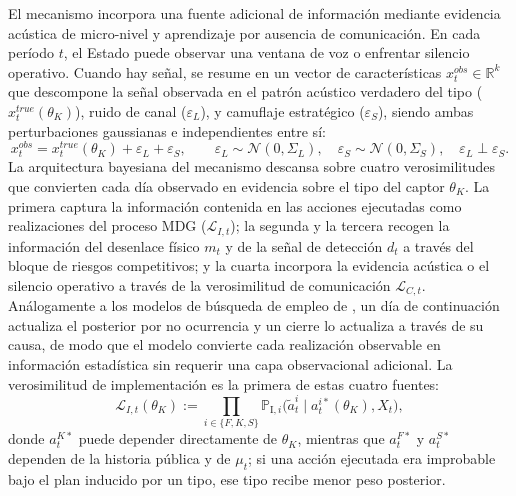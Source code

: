 \documentclass[review,authoryear,12pt]{elsarticle}
\theoremstyle{plain}
\theoremstyle{definition}
\newcommand{\1}{\mathbf{1}}
\newcommand{\ProbI}[1]{\mathbb{P}_{\mathrm{I},#1}}
\begin{document}
El mecanismo incorpora una fuente adicional de información mediante evidencia acústica de micro-nivel y aprendizaje por ausencia de comunicación. En cada período $t$, el Estado puede observar una ventana de voz o enfrentar silencio operativo. Cuando hay señal, se resume en un vector de características $x_t^{obs}\in\mathbb{R}^k$ que descompone la señal observada en el patrón acústico verdadero del tipo ($x_t^{true}(\theta_K)$), ruido de canal ($\varepsilon_L$), y camuflaje estratégico ($\varepsilon_S$), siendo ambas perturbaciones gaussianas e independientes entre sí:
\begin{equation}
x_t^{obs}=x_t^{true}(\theta_K)+\varepsilon_L+\varepsilon_S,\qquad\varepsilon_L\sim\mathcal{N}(0,\Sigma_L),\quad\varepsilon_S\sim\mathcal{N}(0,\Sigma_S),\quad\varepsilon_L\perp\varepsilon_S.
\label{eq:voz-descomp}
\end{equation}
La arquitectura bayesiana del mecanismo descansa sobre cuatro verosimilitudes que convierten cada día observado en evidencia sobre el tipo del captor $\theta_K$. La primera captura la información contenida en las acciones ejecutadas como realizaciones del proceso MDG ($\mathcal{L}_{I,t}$); la segunda y la tercera recogen la información del desenlace físico $m_t$ y de la señal de detección $d_t$ a través del bloque de riesgos competitivos; y la cuarta incorpora la evidencia acústica o el silencio operativo a través de la verosimilitud de comunicación $\mathcal{L}_{C,t}$. Análogamente a los modelos de búsqueda de empleo de \citet{McCall1970}, un día de continuación actualiza el posterior por no ocurrencia y un cierre lo actualiza a través de su causa, de modo que el modelo convierte cada realización observable en información estadística sin requerir una capa observacional adicional. La verosimilitud de implementación es la primera de estas cuatro fuentes:
\begin{equation}
\mathcal{L}_{I,t}(\theta_K):=\prod_{i\in\{F,K,S\}}\ProbI{i}\!\bigl(\tilde{a}_t^i\mid a_t^{i\ast}(\theta_K),X_t\bigr),
\label{eq:LI-atilde}
\end{equation}
donde $a_t^{K\ast}$ puede depender directamente de $\theta_K$, mientras que $a_t^{F\ast}$ y $a_t^{S\ast}$ dependen de la historia pública y de $\mu_t$; si una acción ejecutada era improbable bajo el plan inducido por un tipo, ese tipo recibe menor peso posterior.
\end{document}
